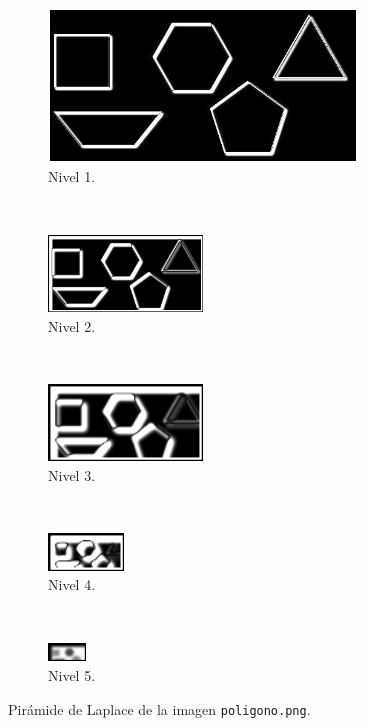 \documentclass[12pt, letterpaper]{article}
\begin{document}
\begin{figure}[H]
  \centering
  \begin{subfigure}[t]{0.48\textwidth}
    \centering
    \includegraphics[width = 0.9\textwidth]{poligono/lp1.png}
    \caption{Nivel 1.}
  \end{subfigure}
  ~ 
  \begin{subfigure}[t]{0.48\textwidth}
      \centering
      \includegraphics[width = 0.45\textwidth]{poligono/lp2.png}
      \caption{Nivel 2.}
  \end{subfigure}
  ~ 
  \begin{subfigure}[t]{0.32\textwidth}
      \centering
      \includegraphics[width = 0.45\textwidth]{poligono/lp3.png}
      \caption{Nivel 3.}
  \end{subfigure}
  ~ 
  \begin{subfigure}[t]{0.32\textwidth}
      \centering
      \includegraphics[width = 0.22\textwidth]{poligono/lp4.png}
      \caption{Nivel 4.}
  \end{subfigure}
  ~ 
  \begin{subfigure}[t]{0.32\textwidth}
      \centering
      \includegraphics[width = 0.11\textwidth]{poligono/lp5.png}
      \caption{Nivel 5.}
  \end{subfigure}
  \caption{Pirámide de Laplace de la imagen \texttt{poligono.png}.}
  \label{lppoligono}
\end{figure}
\end{document}
